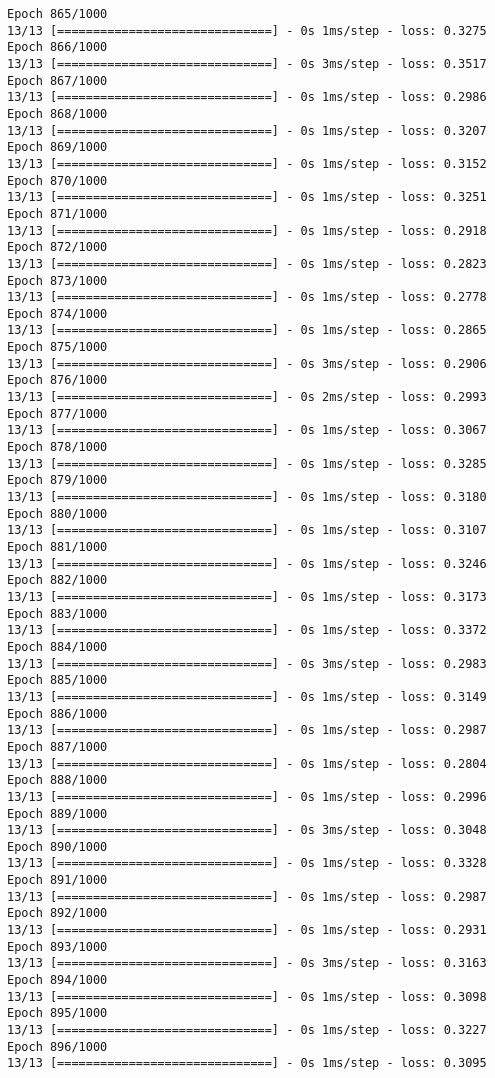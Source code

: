 \documentclass[11pt]{article}
\begin{document}
\begin{Verbatim}[commandchars=\\\{\}]
Epoch 865/1000
13/13 [==============================] - 0s 1ms/step - loss: 0.3275
Epoch 866/1000
13/13 [==============================] - 0s 3ms/step - loss: 0.3517
Epoch 867/1000
13/13 [==============================] - 0s 1ms/step - loss: 0.2986
Epoch 868/1000
13/13 [==============================] - 0s 1ms/step - loss: 0.3207
Epoch 869/1000
13/13 [==============================] - 0s 1ms/step - loss: 0.3152
Epoch 870/1000
13/13 [==============================] - 0s 1ms/step - loss: 0.3251
Epoch 871/1000
13/13 [==============================] - 0s 1ms/step - loss: 0.2918
Epoch 872/1000
13/13 [==============================] - 0s 1ms/step - loss: 0.2823
Epoch 873/1000
13/13 [==============================] - 0s 1ms/step - loss: 0.2778
Epoch 874/1000
13/13 [==============================] - 0s 1ms/step - loss: 0.2865
Epoch 875/1000
13/13 [==============================] - 0s 3ms/step - loss: 0.2906
Epoch 876/1000
13/13 [==============================] - 0s 2ms/step - loss: 0.2993
Epoch 877/1000
13/13 [==============================] - 0s 1ms/step - loss: 0.3067
Epoch 878/1000
13/13 [==============================] - 0s 1ms/step - loss: 0.3285
Epoch 879/1000
13/13 [==============================] - 0s 1ms/step - loss: 0.3180
Epoch 880/1000
13/13 [==============================] - 0s 1ms/step - loss: 0.3107
Epoch 881/1000
13/13 [==============================] - 0s 1ms/step - loss: 0.3246
Epoch 882/1000
13/13 [==============================] - 0s 1ms/step - loss: 0.3173
Epoch 883/1000
13/13 [==============================] - 0s 1ms/step - loss: 0.3372
Epoch 884/1000
13/13 [==============================] - 0s 3ms/step - loss: 0.2983
Epoch 885/1000
13/13 [==============================] - 0s 1ms/step - loss: 0.3149
Epoch 886/1000
13/13 [==============================] - 0s 1ms/step - loss: 0.2987
Epoch 887/1000
13/13 [==============================] - 0s 1ms/step - loss: 0.2804
Epoch 888/1000
13/13 [==============================] - 0s 1ms/step - loss: 0.2996
Epoch 889/1000
13/13 [==============================] - 0s 3ms/step - loss: 0.3048
Epoch 890/1000
13/13 [==============================] - 0s 1ms/step - loss: 0.3328
Epoch 891/1000
13/13 [==============================] - 0s 1ms/step - loss: 0.2987
Epoch 892/1000
13/13 [==============================] - 0s 1ms/step - loss: 0.2931
Epoch 893/1000
13/13 [==============================] - 0s 3ms/step - loss: 0.3163
Epoch 894/1000
13/13 [==============================] - 0s 1ms/step - loss: 0.3098
Epoch 895/1000
13/13 [==============================] - 0s 1ms/step - loss: 0.3227
Epoch 896/1000
13/13 [==============================] - 0s 1ms/step - loss: 0.3095

\end{Verbatim}
\end{document}
